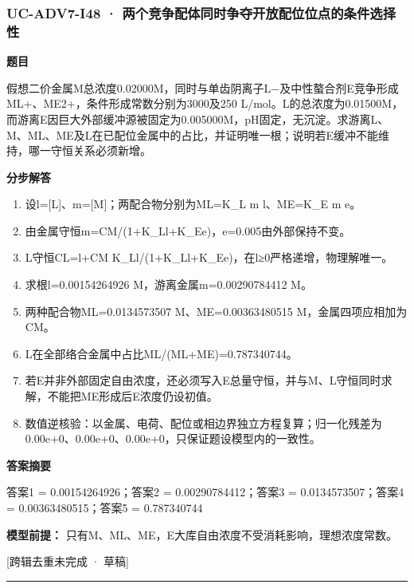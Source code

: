\documentclass[UTF8,11pt,a4paper]{ctexart}
\begin{document}
\subsubsection*{UC-ADV7-I48 · 两个竞争配体同时争夺开放配位位点的条件选择性}
\noindent\textbf{题目}\par
假想二价金属M总浓度0.02000M，同时与单齿阴离子L−及中性螯合剂E竞争形成ML+、ME2+，条件形成常数分别为3000及250 L/mol。L的总浓度为0.01500M，而游离E因巨大外部缓冲源被固定为0.005000M，pH固定，无沉淀。求游离L、M、ML、ME及L在已配位金属中的占比，并证明唯一根；说明若E缓冲不能维持，哪一守恒关系必须新增。\par
\medskip\noindent\textbf{分步解答}
\begin{enumerate}
\item 设l=[L]、m=[M]；两配合物分别为ML=K\_L m l、ME=K\_E m e。
\item 由金属守恒m=CM/(1+K\_Ll+K\_Ee)，e=0.005由外部保持不变。
\item L守恒CL=l+CM K\_Ll/(1+K\_Ll+K\_Ee)，在l≥0严格递增，物理解唯一。
\item 求根l=0.00154264926 M，游离金属m=0.00290784412 M。
\item 两种配合物ML=0.0134573507 M、ME=0.00363480515 M，金属四项应相加为CM。
\item L在全部络合金属中占比ML/(ML+ME)=0.787340744。
\item 若E并非外部固定自由浓度，还必须写入E总量守恒，并与M、L守恒同时求解，不能把ME形成后E浓度仍设初值。
\item 数值逆核验：以金属、电荷、配位或相边界独立方程复算；归一化残差为0.00e+0、0.00e+0、0.00e+0，只保证题设模型内的一致性。
\end{enumerate}
\noindent\textbf{答案摘要}\par
答案1 = 0.00154264926；答案2 = 0.00290784412；答案3 = 0.0134573507；答案4 = 0.00363480515；答案5 = 0.787340744\par
\noindent\textbf{模型前提：}
只有M、ML、ME，E大库自由浓度不受消耗影响，理想浓度常数。\par
\noindent\textcolor{red!65!black}{[跨辑去重未完成 · 草稿]} \par
\medskip\hrule\medskip
{}
\end{document}
